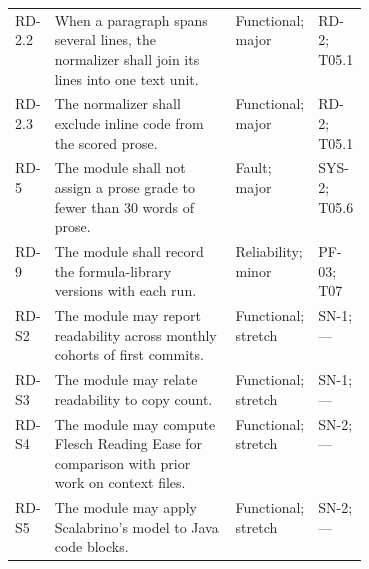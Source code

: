\begin{singlespace}
\begin{longtable}{@{}L{0.09\linewidth} L{\tabcolsep\relax} L{0.18\linewidth} L{0.14\linewidth}@{}}
\addlinespace[3pt]
RD-2.2 & When a paragraph spans several lines, the normalizer shall join its lines into one text unit. & Functional; major & RD-2; T05.1\\
\addlinespace[3pt]
RD-2.3 & The normalizer shall exclude inline code from the scored prose. & Functional; major & RD-2; T05.1\\
\addlinespace[3pt]
RD-5 & The module shall not assign a prose grade to fewer than 30 words of prose. & Fault; major & SYS-2; T05.6\\
\addlinespace[3pt]
RD-9 & The module shall record the formula-library versions with each run. & Reliability; minor & PF-03; T07\\
\addlinespace[3pt]
RD-S2 & The module may report readability across monthly cohorts of first commits. & Functional; stretch & SN-1; ---\\
\addlinespace[3pt]
RD-S3 & The module may relate readability to copy count. & Functional; stretch & SN-1; ---\\
\addlinespace[3pt]
RD-S4 & The module may compute Flesch Reading Ease for comparison with prior work on context files. & Functional; stretch & SN-2; ---\\
\addlinespace[3pt]
RD-S5 & The module may apply Scalabrino's model to Java code blocks. & Functional; stretch & SN-2; ---\\
\end{longtable}
\end{singlespace}

